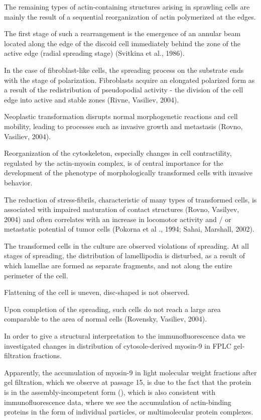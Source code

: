 \documentclass[alpha-refs]{wiley-article}
\begin{document}
The remaining types of actin-containing structures arising in sprawling cells are mainly the result of a sequential reorganization of actin polymerized at the edges.

The first stage of such a rearrangement is the emergence of an annular beam located along the edge of the discoid cell immediately behind the zone of the active edge (radial spreading stage) (Svitkina et al., 1986).

In the case of fibroblast-like cells, the spreading process on the substrate ends with the stage of polarization. Fibroblasts acquire an elongated polarized form as a result of the redistribution of pseudopodial activity - the division of the cell edge into active and stable zones (Rivne, Vasiliev, 2004).

Neoplastic transformation disrupts normal morphogenetic reactions and cell mobility, leading to processes such as invasive growth and metastasis (Rovno, Vasiliev, 2004).

Reorganization of the cytoskeleton, especially changes in cell contractility, regulated by the actin-myosin complex, is of central importance for the development of the phenotype of morphologically transformed cells with invasive behavior.

The reduction of stress-fibrils, characteristic of many types of transformed cells, is associated with impaired maturation of contact structures (Rovno, Vasilyev, 2004) and often correlates with an increase in locomotor activity and / or metastatic potential of tumor cells (Pokorna et al ., 1994; Sahai, Marshall, 2002).

The transformed cells in the culture are observed violations of spreading.
At all stages of spreading, the distribution of lamellipodia is disturbed, as a result of which lamellae are formed as separate fragments, and not along the entire perimeter of the cell.

Flattening of the cell is uneven, disc-shaped is not observed.

Upon completion of the spreading, such cells do not reach a large area comparable to the area of normal cells (Rovensky, Vasiliev, 2004).

In order to give a structural interpretation to the immunofluorescence data we investigated changes in distribution of cytosole-derived myosin-9 in FPLC gel-filtration fractions.

Apparently, the accumulation of myosin-9 in light molecular weight fractions after gel filtration, which we observe at passage 15, is due to the fact that the protein is in the assembly-incompetent form (\cite{vicente2009non}), which is also consistent with immunofluorescence data, where we see the accumulation of actin-binding proteins in the form of individual particles, or multimolecular protein complexes.
\end{document}

